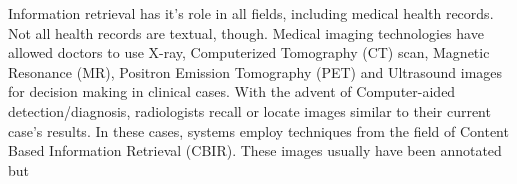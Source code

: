 Information retrieval has it's role in all fields, including medical health records. Not all health records are textual, though. Medical imaging technologies have allowed doctors to use X-ray, Computerized Tomography (CT) scan, Magnetic Resonance (MR), Positron Emission Tomography (PET) and Ultrasound images for decision making in clinical cases. With the advent of Computer-aided detection/diagnosis, radiologists recall or locate images similar to their current case's results. In these cases, systems employ techniques from the field of Content Based Information Retrieval (CBIR). These images usually have been annotated but 